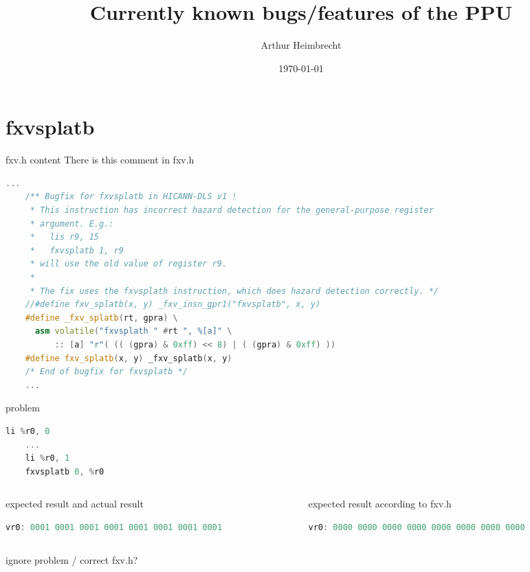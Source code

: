 \documentclass[10pt]{beamer}
\title{Currently known bugs/features of the PPU}
\author{Arthur Heimbrecht}
\date{\today}
\begin{document}
\begin{frame}
\titlepage
\end{frame}

\begin{frame}
\tableofcontents
\end{frame}


\section{fxvsplatb}
\begin{frame}[fragile]{fxv.h content}{}
There is this comment in fxv.h
\begin{lstlisting}[language=C++,basicstyle=\fontsize{5}{7}\selectfont\ttfamily,keywordstyle=\color{red}]
	...
	/** Bugfix for fxvsplatb in HICANN-DLS v1 !
	 * This instruction has incorrect hazard detection for the general-purpose register
	 * argument. E.g.:
	 *   lis r9, 15
	 *   fxvsplatb 1, r9
	 * will use the old value of register r9.
	 *
	 * The fix uses the fxvsplath instruction, which does hazard detection correctly. */
	//#define fxv_splatb(x, y) _fxv_insn_gpr1("fxvsplatb", x, y)
	#define _fxv_splatb(rt, gpra) \
	  asm volatile("fxvsplath " #rt ", %[a]" \
	      :: [a] "r"( (( (gpra) & 0xff) << 8) | ( (gpra) & 0xff) ))
	#define fxv_splatb(x, y) _fxv_splatb(x, y)
	/* End of bugfix for fxvsplatb */
	...
\end{lstlisting}
\end{frame}

\begin{frame}[fragile]{problem}{}
    \begin{lstlisting}[language=C++,basicstyle=\ttfamily\scriptsize,keywordstyle=\color{red}]
	li %r0, 0
	...
	li %r0, 1
	fxvsplatb 0, %r0
	\end{lstlisting}
	\begin{columns}[t]
		\begin{column}{0.4\textwidth}
			\begin{block}{expected result and actual result}
      			\begin{lstlisting}[language=C++,basicstyle=\fontsize{5}{7}\selectfont\ttfamily,keywordstyle=\color{red}]
				vr0: 0001 0001 0001 0001 0001 0001 0001 0001
				\end{lstlisting}
			\end{block}
    	\end{column}
    	\begin{column}{0.4\textwidth}
    		\begin{block}{expected result according to fxv.h}
      			\begin{lstlisting}[language=C++,basicstyle=\fontsize{5}{7}\selectfont\ttfamily,keywordstyle=\color{red}]
				vr0: 0000 0000 0000 0000 0000 0000 0000 0000
				\end{lstlisting}
			\end{block}
    	\end{column}
	\end{columns}
	ignore problem / correct fxv.h?
\end{frame}
\end{document}
